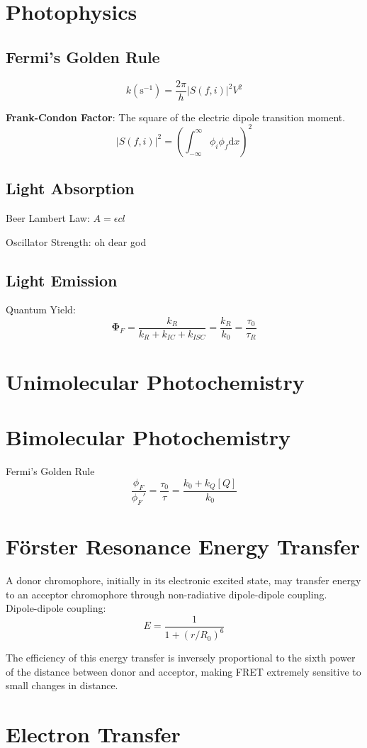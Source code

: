 \section{Photophysics}
\subsection*{Fermi's Golden Rule}
$$k(\mathrm{s}^{-1}) = \frac{2\pi}{h}|S(f,i)|^2V^2$$

\textbf{Frank-Condon Factor}: The square of the electric dipole transition moment.
$$|S(f,i)|^2 = \left( \int^{\infty}_{-\infty}\phi_i\phi_f \mathrm{d}x \right)^2$$
\subsection*{Light Absorption}
Beer Lambert Law: $A = \epsilon cl$

Oscillator Strength: oh dear god

\subsection*{Light Emission}
Quantum Yield:
$$\mathbf{\Phi}_F = \frac{k_R}{k_R + k_{IC} + k_{ISC}} = \frac{k_R}{k_0} = \frac{\tau_0}{\tau_R}$$

\section{Unimolecular Photochemistry}
\section{Bimolecular Photochemistry}
Fermi's Golden Rule
\begin{equation*}
  \frac{\phi_{F}}{\phi_{F}'} = \frac{\tau_0}{\tau} = \frac{k_0 + k_Q[Q]}{k_0}
\end{equation*}
\section{Förster Resonance Energy Transfer}
A donor chromophore, initially in its electronic excited state, may transfer energy to an acceptor chromophore 
through non-radiative dipole-dipole coupling. \\

Dipole-dipole coupling:
$$E = \frac{1}{1 + (r/R_0)^6}$$

The efficiency of this energy transfer is inversely proportional to the sixth power of the distance between donor 
and acceptor, making FRET extremely sensitive to small changes in distance.

\section{Electron Transfer}
